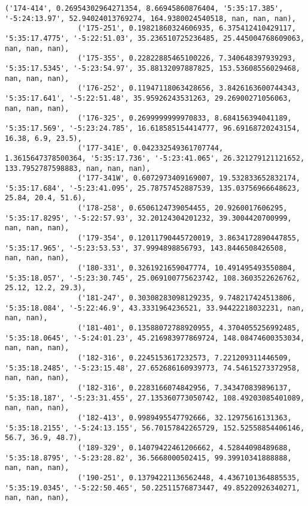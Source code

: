 \documentclass{article}
\begin{document}
\begin{Verbatim}[commandchars=\\\{\}]
                 ('174-414', 0.26954302964271354, 8.66945860876404, '5:35:17.385', '-5:24:13.97', 52.94024013769274, 164.9380024540518, nan, nan, nan),
                 ('175-251', 0.19821860324606935, 6.375412410429117, '5:35:17.4775', '-5:22:51.03', 35.236510725236485, 25.445004768609063, nan, nan, nan),
                 ('175-355', 0.22822885465100226, 7.340648397939293, '5:35:17.5345', '-5:23:54.97', 35.88132097887825, 153.53608556029468, nan, nan, nan),
                 ('176-252', 0.11947118063428656, 3.8426163600744343, '5:35:17.641', '-5:22:51.48', 35.95926243531263, 29.26900271056063, nan, nan, nan),
                 ('176-325', 0.2699999999970833, 8.684156394041189, '5:35:17.569', '-5:23:24.785', 16.618585154414777, 96.69168720243154, 16.38, 6.9, 23.5),
                 ('177-341E', 0.042332549361707744, 1.3615647378500364, '5:35:17.736', '-5:23:41.065', 26.321279121121652, 133.7952787598883, nan, nan, nan),
                 ('177-341W', 0.6072973409169007, 19.532833652832174, '5:35:17.684', '-5:23:41.095', 25.78757452887539, 135.03756966648623, 25.84, 20.4, 51.6),
                 ('178-258', 0.6506124739054455, 20.9260017606295, '5:35:17.8295', '-5:22:57.93', 32.20124304201232, 39.3004420700999, nan, nan, nan),
                 ('179-354', 0.12011790445720019, 3.8634172890447855, '5:35:17.965', '-5:23:53.53', 37.9994898856793, 143.8446508426508, nan, nan, nan),
                 ('180-331', 0.3261921659047774, 10.491495493550804, '5:35:18.057', '-5:23:30.745', 25.069100775623742, 108.3603522626762, 25.12, 12.2, 29.3),
                 ('181-247', 0.30308283098129235, 9.748217424513806, '5:35:18.084', '-5:22:46.9', 43.3331964236521, 33.94422218032231, nan, nan, nan),
                 ('181-401', 0.13588072788920955, 4.3704055256992485, '5:35:18.0645', '-5:24:01.23', 45.216983977869724, 148.08474600353034, nan, nan, nan),
                 ('182-316', 0.2245153617232573, 7.221209311446509, '5:35:18.2485', '-5:23:15.48', 27.652686160939773, 74.54615273372958, nan, nan, nan),
                 ('182-316', 0.2283166074842956, 7.343470839896137, '5:35:18.187', '-5:23:31.455', 27.135360773050742, 108.49203085401089, nan, nan, nan),
                 ('182-413', 0.9989495547792666, 32.12975616131363, '5:35:18.2155', '-5:24:13.155', 56.70157842265729, 152.52558854406146, 56.7, 36.9, 48.7),
                 ('189-329', 0.14079422461206662, 4.52844098489688, '5:35:18.8795', '-5:23:28.82', 36.5668000502415, 99.39910341888888, nan, nan, nan),
                 ('190-251', 0.13794221136562448, 4.4367101364885535, '5:35:19.0345', '-5:22:50.465', 50.22511576873447, 49.85220926340271, nan, nan, nan),

\end{Verbatim}
\end{document}
